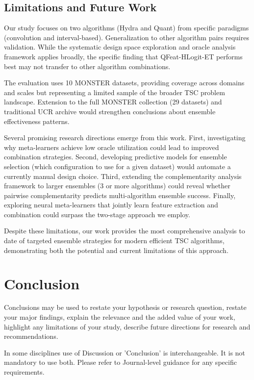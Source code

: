 \documentclass[pdflatex,sn-basic]{sn-jnl}           %
\theoremstyle{thmstyleone}%
\theoremstyle{thmstyletwo}%
\theoremstyle{thmstylethree}%
\begin{document}
\subsection{Limitations and Future Work}

Our study focuses on two algorithms (Hydra and Quant) from specific paradigms (convolution and interval-based). Generalization to other algorithm pairs requires validation. While the systematic design space exploration and oracle analysis framework applies broadly, the specific finding that QFeat-HLogit-ET performs best may not transfer to other algorithm combinations.

The evaluation uses 10 MONSTER datasets, providing coverage across domains and scales but representing a limited sample of the broader TSC problem landscape. Extension to the full MONSTER collection (29 datasets) and traditional UCR archive would strengthen conclusions about ensemble effectiveness patterns.

Several promising research directions emerge from this work. First, investigating why meta-learners achieve low oracle utilization could lead to improved combination strategies. Second, developing predictive models for ensemble selection (which configuration to use for a given dataset) would automate a currently manual design choice. Third, extending the complementarity analysis framework to larger ensembles (3 or more algorithms) could reveal whether pairwise complementarity predicts multi-algorithm ensemble success. Finally, exploring neural meta-learners that jointly learn feature extraction and combination could surpass the two-stage approach we employ.

Despite these limitations, our work provides the most comprehensive analysis to date of targeted ensemble strategies for modern efficient TSC algorithms, demonstrating both the potential and current limitations of this approach.

\clearpage

\section{Conclusion}\label{sec13}

Conclusions may be used to restate your hypothesis or research question, restate your major findings, explain the relevance and the added value of your work, highlight any limitations of your study, describe future directions for research and recommendations. 

In some disciplines use of Discussion or 'Conclusion' is interchangeable. It is not mandatory to use both. Please refer to Journal-level guidance for any specific requirements. 
\end{document}
